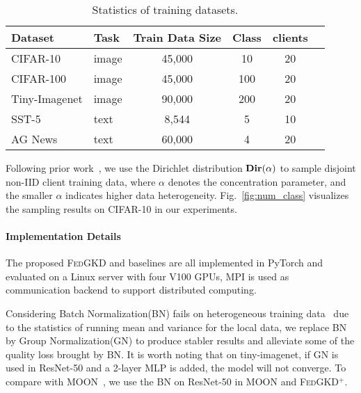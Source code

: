 \documentclass{article} %
\newcommand{\system}{\textsc{FedGKD}\xspace}
\begin{document}
\begin{table}[!ht]
\centering
 \caption{Statistics of training datasets.}
\small
\setlength{\tabcolsep}{4pt} %
\begin{tabular}{llcccc}
\hline
  Dataset & Task & Train Data Size & Class & clients\\
  \hline
  CIFAR-10& image& 45,000 & 10 & 20\\
  CIFAR-100& image& 45,000& 100 & 20\\
  Tiny-Imagenet & image& 90,000 & 200 & 20\\
  \hline
  SST-5& text& 8,544 & 5 & 10 \\
  AG News& text& 60,000& 4 & 20\\
    \bottomrule
  \end{tabular}
 \label{tbl:table-data}
\end{table}
Following prior work~\citep{lin2020ensemble,hsu2019measuring}, we use the Dirichlet distribution $\bf{Dir}(\alpha)$ to sample disjoint non-IID client training data, where $\alpha$ denotes the concentration parameter, and the smaller $\alpha$ indicates higher data heterogeneity. Fig.~\ref{fig:num_class} visualizes the sampling results on CIFAR-10 in our experiments. 


\paragraph{Implementation Details}
The proposed \system and baselines are all implemented in PyTorch and evaluated on a Linux server with four V100 GPUs, MPI is used as communication backend to support distributed computing.

Considering Batch Normalization(BN) fails on heterogeneous training data~\citep{hsieh2020non} due to the statistics of running mean and variance for the local data, we replace BN by Group Normalization(GN) to produce stabler results and alleviate some of the quality loss brought by BN. It is worth noting that on tiny-imagenet, if GN is used in ResNet-50 and a 2-layer MLP is added, the model will not converge. To compare with MOON~\citep{li2021model}, we use the BN on ResNet-50 in MOON and \system$^{+}$.
\end{document}
